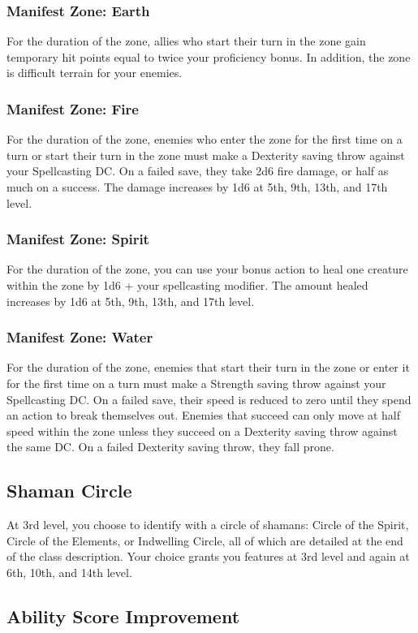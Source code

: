 \subsubsection{Manifest Zone: Earth}
For the duration of the zone, allies who start their turn in the zone gain temporary hit points equal to twice your proficiency bonus. In addition, the zone is difficult terrain for your enemies.
\subsubsection{Manifest Zone: Fire}
For the duration of the zone, enemies who enter the zone for the first time on a turn or start their turn in the zone must make a Dexterity saving throw against your Spellcasting DC. On a failed save, they take 2d6 fire damage, or half as much on a success. The damage increases by 1d6 at 5th, 9th, 13th, and 17th level.
\subsubsection{Manifest Zone: Spirit}
For the duration of the zone, you can use your bonus action to heal one creature within the zone by 1d6 + your spellcasting modifier. The amount healed increases by 1d6 at 5th, 9th, 13th, and 17th level.
\subsubsection{Manifest Zone: Water}
For the duration of the zone, enemies that start their turn in the zone or enter it for the first time on a turn must make a Strength saving throw against your Spellcasting DC. On a failed save, their speed is reduced to zero until they spend an action to break themselves out. Enemies that succeed can only move at half speed within the zone unless they succeed on a Dexterity saving throw against the same DC. On a failed Dexterity saving throw, they fall prone.

\subsection{Shaman Circle}

At 3rd level, you choose to identify with a circle of shamans: Circle of the Spirit, Circle of the Elements, or Indwelling Circle, all of which are detailed at the end of the class description. Your choice grants you features at 3rd level and again at 6th, 10th, and 14th level.

\subsection{Ability Score Improvement}


